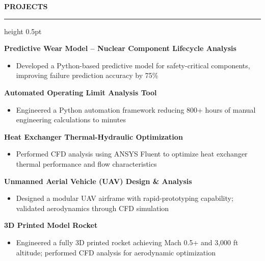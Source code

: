 \documentclass[10pt,letterpaper]{article}
\renewcommand{\section}[1]{
    \vspace{5pt}
    {\normalsize\bfseries\textcolor{navyblue}{\MakeUppercase{#1}}}
    \vspace{0pt}
    
    {\color{navyblue}\hrule height 0.5pt}
    \vspace{3pt}
}
\newcommand{\projectEntry}[1]{
    \textbf{#1}
    \vspace{0pt}
}
\begin{document}
\section{Projects}

\projectEntry{Predictive Wear Model -- Nuclear Component Lifecycle Analysis}
\begin{itemize}
    \item Developed a Python-based predictive model for safety-critical components, improving failure prediction accuracy by 75\%
\end{itemize}

\vspace{1pt}

\projectEntry{Automated Operating Limit Analysis Tool}
\begin{itemize}
    \item Engineered a Python automation framework reducing 800+ hours of manual engineering calculations to minutes
\end{itemize}

\vspace{1pt}

\projectEntry{Heat Exchanger Thermal-Hydraulic Optimization}
\begin{itemize}
    \item Performed CFD analysis using ANSYS Fluent to optimize heat exchanger thermal performance and flow characteristics
\end{itemize}

\vspace{1pt}

\projectEntry{Unmanned Aerial Vehicle (UAV) Design \& Analysis}
\begin{itemize}
    \item Designed a modular UAV airframe with rapid-prototyping capability; validated aerodynamics through CFD simulation
\end{itemize}

\vspace{1pt}

\projectEntry{3D Printed Model Rocket}
\begin{itemize}
    \item Engineered a fully 3D printed rocket achieving Mach 0.5+ and 3,000 ft altitude; performed CFD analysis for aerodynamic optimization
\end{itemize}
\end{document}
